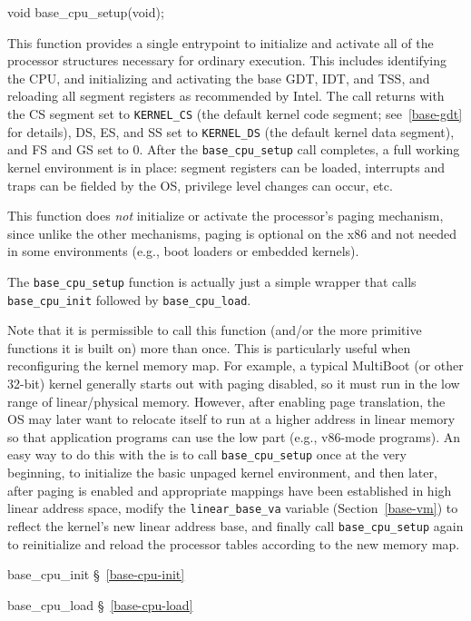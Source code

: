 \label{base-cpu-setup}
\begin{apisyn}

	\funcproto void base_cpu_setup(void);
\end{apisyn}
\begin{apidesc}
	This function provides a single entrypoint
	to initialize and activate all of the processor structures
	necessary for ordinary execution.
	This includes identifying the CPU,
	and initializing and activating the base GDT, IDT, and TSS,
	and reloading all segment registers as recommended by Intel.
	The call returns with the CS segment set to {\tt KERNEL_CS}
	(the default kernel code segment; see~\ref{base-gdt} for details),
	DS, ES, and SS set to {\tt KERNEL_DS}
	(the default kernel data segment),
	and FS and GS set to 0.
	After the {\tt base_cpu_setup} call completes,
	a full working kernel environment is in place:
	segment registers can be loaded,
	interrupts and traps can be fielded by the OS,
	privilege level changes can occur, etc.

	This function does \emph{not} initialize or activate
	the processor's paging mechanism,
	since unlike the other mechanisms,
	paging is optional on the x86 and not needed in some environments
	(e.g., boot loaders or embedded kernels).

	The {\tt base_cpu_setup} function is actually just a simple wrapper
	that calls {\tt base_cpu_init} followed by {\tt base_cpu_load}.

	Note that it is permissible to call this function
	(and/or the more primitive functions it is built on)
	more than once.
	This is particularly useful
	when reconfiguring the kernel memory map.
	For example, a typical MultiBoot (or other 32-bit) kernel
	generally starts out with paging disabled,
	so it must run in the low range of linear/physical memory.
	However, after enabling page translation,
	the OS may later want to relocate itself
	to run at a higher address in linear memory
	so that application programs can use the low part
	(e.g., v86-mode programs).
	An easy way to do this with the \oskit{}
	is to call {\tt base_cpu_setup} once at the very beginning,
	to initialize the basic unpaged kernel environment,
	and then later, after paging is enabled
	and appropriate mappings have been established
	in high linear address space,
	modify the {\tt linear_base_va} variable (Section~\ref{base-vm})
	to reflect the kernel's new linear address base,
	and finally call {\tt base_cpu_setup} again
	to reinitialize and reload the processor tables
	according to the new memory map.

\end{apidesc}
\begin{apidep}
	\item[base_cpu_init]	\S~\ref{base-cpu-init}
	\item[base_cpu_load]	\S~\ref{base-cpu-load}
\end{apidep}

